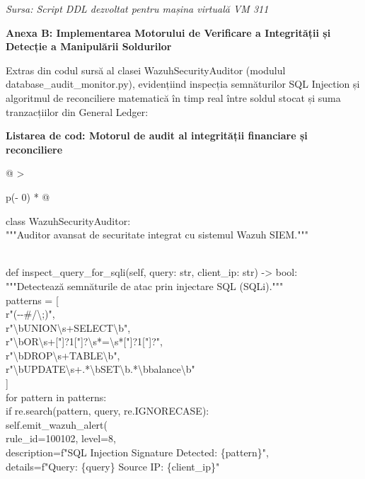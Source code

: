 \documentclass[
]{article}
\begin{document}
\emph{Sursa: Script DDL dezvoltat pentru mașina virtuală VM 311}

\textbf{Anexa B: Implementarea Motorului de Verificare a Integrității și
Detecție a Manipulării Soldurilor}

Extras din codul sursă al clasei WazuhSecurityAuditor (modulul
database\_audit\_monitor.py), evidențiind inspecția semnăturilor SQL
Injection și algoritmul de reconciliere matematică în timp real între
soldul stocat și suma tranzacțiilor din General Ledger:

\textbf{Listarea de cod: Motorul de audit al integrității financiare și
reconciliere}

\begin{longtable}[]{@{}
  >{\raggedright\arraybackslash}p{(\columnwidth - 0\tabcolsep) * }@{}}
\toprule\noalign{}
\begin{minipage}[b]{\linewidth}\raggedright
class WazuhSecurityAuditor:\\
"""Auditor avansat de securitate integrat cu sistemul Wazuh SIEM."""\\
\strut \\
def inspect\_query\_for\_sqli(self, query: str, client\_ip: str)
-\textgreater{} bool:\\
"""Detectează semnăturile de atac prin injectare SQL (SQLi)."""\\
patterns = {[}\\
r"(-\/-\textbar\#\textbar/\textbackslash*\textbar;)",\\
r"\textbackslash bUNION\textbackslash s+SELECT\textbackslash b",\\
r"\textbackslash bOR\textbackslash s+{[}\textquotesingle"{]}?1{[}\textquotesingle"{]}?\textbackslash s*=\textbackslash s*{[}\textquotesingle"{]}?1{[}\textquotesingle"{]}?",\\
r"\textbackslash bDROP\textbackslash s+TABLE\textbackslash b",\\
r"\textbackslash bUPDATE\textbackslash s+.*\textbackslash bSET\textbackslash b.*\textbackslash bbalance\textbackslash b"\\
{]}\\
for pattern in patterns:\\
if re.search(pattern, query, re.IGNORECASE):\\
self.emit\_wazuh\_alert(\\
rule\_id=100102, level=8,\\
description=f"SQL Injection Signature Detected: \{pattern\}",\\
details=f"Query: \{query\} \textbar{} Source IP: \{client\_ip\}"\\

\end{minipage}
\end{longtable}
\end{document}
